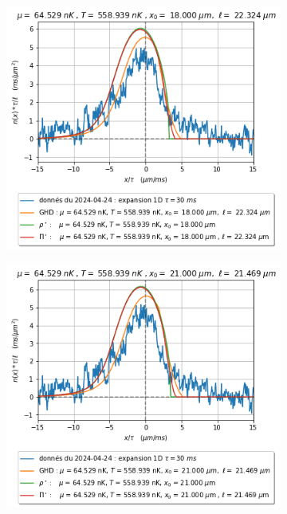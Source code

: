 \documentclass[a3, 10pt,twoside]{article}          %
\theoremstyle{plain}
\theoremstyle{definition}
\theoremstyle{remark}
\theoremstyle{definition} %
\begin{document}
\begin{figure}[H]
     \begin{subfigure}[b]{0.32\textwidth}
        \centering
        \includegraphics[width=\textwidth]{Figures/simul_expansion_30_expansion_18}
        \caption{}
        \label{}
    \end{subfigure}
    \hfill
    \begin{subfigure}[b]{0.32\textwidth}
        \centering
        \includegraphics[width=\textwidth]{Figures/simul_expansion_30_expansion_21}

\end{subfigure}
\end{figure}
\end{document}
